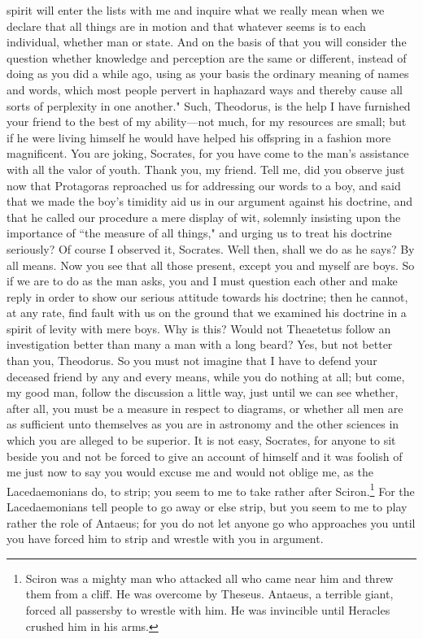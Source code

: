 \documentclass[letterpaper,12pt]{article}
\newcommand{\stephpag}[1]{\marginnote{\small\itshape\fontfamily{ppl}\selectfont #1}}
\begin{document}
\begin{drama}
spirit will enter the lists with me and inquire what we really mean when we declare that all things are in motion and that whatever seems is to each individual, whether man or state. And on the basis of that you will consider the question whether knowledge and perception are the same or different, instead of doing as you did a while ago, using as your basis \stephpag{c} the ordinary meaning of names and words, which most people pervert in haphazard ways and thereby cause all sorts of perplexity in one another." Such, Theodorus, is the help I have furnished your friend to the best of my ability—not much, for my resources are small; but if he were living himself he would have helped his offspring in a fashion more magnificent.
\theodorusspeaks
You are joking, Socrates, for you have come to the man's assistance with all the valor of youth.
\socratesspeaks
Thank you, my friend. Tell me, did you observe just now that Protagoras reproached us \stephpag{d} for addressing our words to a boy, and said that we made the boy's timidity aid us in our argument against his doctrine, and that he called our procedure a mere display of wit, solemnly insisting upon the importance of ``the measure of all things," and urging us to treat his doctrine seriously?
\theodorusspeaks
Of course I observed it, Socrates.
\socratesspeaks
Well then, shall we do as he says?
\theodorusspeaks
By all means.
\socratesspeaks
Now you see that all those present, except you and myself are boys. So if we are to do as the man asks, you and I must \stephpag{e} question each other and make reply in order to show our serious attitude towards his doctrine; then he cannot, at any rate, find fault with us on the ground that we examined his doctrine in a spirit of levity with mere boys.
\theodorusspeaks
Why is this? Would not Theaetetus follow an investigation better than many a man with a long beard?
\socratesspeaks
Yes, but not better than you, Theodorus. So you must not imagine that I have to defend your deceased friend \stephpag{169 a} by any and every means, while you do nothing at all; but come, my good man, follow the discussion a little way, just until we can see whether, after all, you must be a measure in respect to diagrams, or whether all men are as sufficient unto themselves as you are in astronomy and the other sciences in which you are alleged to be superior.
\theodorusspeaks
It is not easy, Socrates, for anyone to sit beside you and not be forced to give an account of himself and it was foolish of me just now to say you would excuse me and would not oblige me, as the Lacedaemonians do, to strip; you seem to me to take rather after Sciron.\footnote{Sciron was a mighty man who attacked all who came near him and threw them from a cliff. He was overcome by Theseus. Antaeus, a terrible giant, forced all passersby to wrestle with him. He was invincible until Heracles crushed him in his arms.} For the Lacedaemonians \stephpag{b} tell people to go away or else strip, but you seem to me to play rather the role of Antaeus; for you do not let anyone go who approaches you until you have forced him to strip and wrestle with you in argument.

\end{drama}
\end{document}
